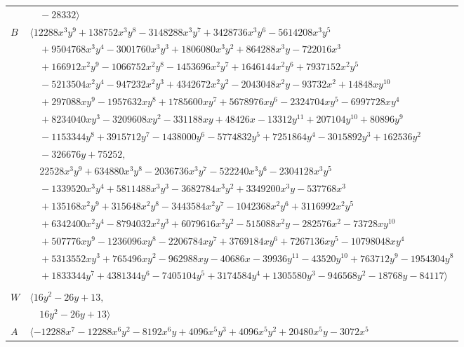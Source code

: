 \documentclass[11pt]{article}
\begin{document}
\begin{longtable}{@{}ll@{}}
 & $\quad -28332\rangle$\\
$B$ & $\langle 12288x^{3}y^{9}+138752x^{3}y^{8}-3148288x^{3}y^{7}+3428736x^{3}y^{6}-5614208x^{3}y^{5}$\\
 & $\quad +9504768x^{3}y^{4}-3001760x^{3}y^{3}+1806080x^{3}y^{2}+864288x^{3}y-722016x^{3}$\\
 & $\quad +166912x^{2}y^{9}-1066752x^{2}y^{8}-1453696x^{2}y^{7}+1646144x^{2}y^{6}+7937152x^{2}y^{5}$\\
 & $\quad -5213504x^{2}y^{4}-947232x^{2}y^{3}+4342672x^{2}y^{2}-2043048x^{2}y-93732x^{2}+14848xy^{10}$\\
 & $\quad +297088xy^{9}-1957632xy^{8}+1785600xy^{7}+5678976xy^{6}-2324704xy^{5}-6997728xy^{4}$\\
 & $\quad +8234040xy^{3}-3209608xy^{2}-331188xy+48426x-13312y^{11}+207104y^{10}+80896y^{9}$\\
 & $\quad -1153344y^{8}+3915712y^{7}-1438000y^{6}-5774832y^{5}+7251864y^{4}-3015892y^{3}+162536y^{2}$\\
 & $\quad -326676y+75252,$\\
 & $\quad 22528x^{3}y^{9}+634880x^{3}y^{8}-2036736x^{3}y^{7}-522240x^{3}y^{6}-2304128x^{3}y^{5}$\\
 & $\quad -1339520x^{3}y^{4}+5811488x^{3}y^{3}-3682784x^{3}y^{2}+3349200x^{3}y-537768x^{3}$\\
 & $\quad +135168x^{2}y^{9}+315648x^{2}y^{8}-3443584x^{2}y^{7}-1042368x^{2}y^{6}+3116992x^{2}y^{5}$\\
 & $\quad +6342400x^{2}y^{4}-8794032x^{2}y^{3}+6079616x^{2}y^{2}-515088x^{2}y-282576x^{2}-73728xy^{10}$\\
 & $\quad +507776xy^{9}-1236096xy^{8}-2206784xy^{7}+3769184xy^{6}+7267136xy^{5}-10798048xy^{4}$\\
 & $\quad +5313552xy^{3}+765496xy^{2}-962988xy-40686x-39936y^{11}-43520y^{10}+763712y^{9}-1954304y^{8}$\\
 & $\quad +1833344y^{7}+4381344y^{6}-7405104y^{5}+3174584y^{4}+1305580y^{3}-946568y^{2}-18768y-84117\rangle$\\
\addlinespace[2pt]
\multicolumn{2}{@{}p{0.97\textwidth}@{}}{$i=39$, $D_i=8$, $\rho_{ij}$: $4{:}2, \allowbreak 28{:}2, \allowbreak 32{:}2, \allowbreak 37{:}1, \allowbreak 50{:}2, \allowbreak 52{:}2$}\\
$W$ & $\langle 16y^{2}-26y+13,$\\
 & $\quad 16y^{2}-26y+13\rangle$\\
$A$ & $\langle -12288x^{7}-12288x^{6}y^{2}-8192x^{6}y+4096x^{5}y^{3}+4096x^{5}y^{2}+20480x^{5}y-3072x^{5}$\\

\end{longtable}
\end{document}
